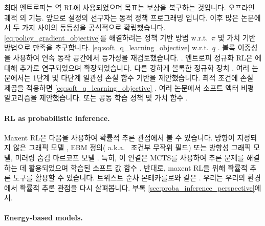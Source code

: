 \documentclass{article}
\def\aka{{a.k.a.\ }}
\def\wrt{{w.r.t.\ }}
\begin{document}
최대 엔트로피는 역 RL에 사용되었으며 목표는 보상을 복구하는 것입니다.
오프라인 궤적 \citep{ziebart2008maximum}의 기능.  앞으로
설정의 선구자는 동적 정책 프로그래밍 \citep{azar2012dynamic} 입니다.
이후 많은 논문에서 두 가지 사이의 동등성을 공식적으로 확립했습니다.
\eqref{eq:policy_gradient_objective}를 해결하려는 정책 기반 방법 
 \wrt $\pi$ 및 가치 기반 방법으로 만족을 추구합니다.
 \eqref{eq:soft_q_learning_objective} \wrt $q$ 
 \citep{o2016pgq,haarnoja2017reinforcement,nachum2017bridging,schulman2017equivalence} .
볼록 이중성을 사용하여 연속 동작 공간에서 등가성을 재검토했습니다.
 \citep{richemond2017short} .
엔트로피 정규화 RL은 \citep{neu2017unified}에 대해 추가로 연구되었으며 확장되었습니다.
다른 강하게 볼록한 정규화 장치 \citep{geist2019theory} .
여러 논문에서는 1단계 및 다단계 일관성 손실 함수 기반을 제안했습니다.
최적 조건에 손실 제곱을 적용하면
 \eqref{eq:soft_q_learning_objective} 
 \citep{nachum2017bridging,schulman2017equivalence,clavier2025shiq} .
여러 논문에서 소프트 액터 비평 알고리즘을 제안했습니다.
 \citep{o2016pgq,haarnoja2017reinforcement,haarnoja2018soft} 또는 공동 학습
정책 및 가치 함수 \citep{richemond2024offline} .


\paragraph{RL as probabilistic inference.}

Maxent RL은 다음을 사용하여 확률적 추론 관점에서 볼 수 있습니다.
방향이 지정되지 않은 그래픽 모델
 \citep{toussaint2009probabilistic,ziebart2010modeling} , EBM 정의( \aka 
조건부 무작위 필드) 또는 방향성 그래픽 모델, 미러링 숨김
마르코프 모델 \citep{attias2003planning,levine2018reinforcement} .  특히,
이 연결은 MCTS를 사용하여 추론 문제를 해결하는 데 활용되었으며
학습된 소프트 값 함수 \citep{buesing2020approximate} .  반대로,
maxent RL을 위해 확률적 추론 도구를 활용할 수 있습니다.
 트위스트 순차 몬테카를로와 같은 \citep{korbak2022rl}
 \citep{zhao2024probabilistic} .
우리는 우리의 환경에서 확률적 추론 관점을 다시 살펴봅니다.
부록 \ref{sec:proba_inference_perspective}에서.

\paragraph{Energy-based models.}
\end{document}
